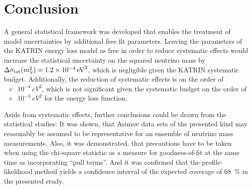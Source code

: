 \section{Conclusion}
\label{sec:katrinElossModelOutlook}
A general statistical framework was developed that enables the treatment of model uncertainties by additional free fit parameters. Leaving the parameters of the KATRIN energy loss model as free in order to reduce systematic effects would increase the statistical uncertainty on the squared neutrino mass by $\Delta \sigma_\mathrm{tot}(m_\upnu^2) = \SI{1.2e-4}{eV^2}$, which is negligible given the KATRIN systematic budget. Additionally, the reduction of systematic effects is on the order of $\SI{e-4}{eV^2}$, which is not significant given the systematic budget on the order of $\SI{e-3}{eV^2}$ for the energy loss function.

Aside from systematic effects, further conclusions could be drawn from the statistical studies: It was shown, that Asimov data sets of the presented kind may reasonably be assumed to be representative for an ensemble of neutrino mass measurements. Also, it was demonstrated, that precautions have to be taken when using the chi-square statistic as a measure for goodness-of-fit at the same time as incorporating ``pull terms''. And it was confirmed that the profile-likelihood method yields a confidence interval of the expected coverage of \SI{68}{\percent} in the presented study.